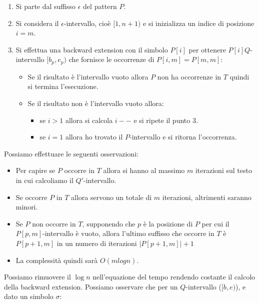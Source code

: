 \begin{enumerate}
    \item Si parte dal suffisso $\epsilon$ del pattern $P$.
    \item Si considera il $\epsilon$-intervallo, cioè $[1,n+1)$ e si inizializza
          un indice di posizione $i=m$.
    \item Si effettua una backward extension con il simbolo $P[i]$ per ottenere
          $P[i]Q$-intervallo $[b_p, e_p)$ che fornisce le occorrenze di $P[i,m] = P[m,m]$:
          \begin{itemize}
              \item Se il risultato è l'intervallo vuoto allora $P$ non ha
                    occorrenze in $T$ quindi si termina l'esecuzione.
              \item Se il risultato non è l'intervallo vuoto allora:
                    \begin{itemize}
                        \item se $i>1$ allora si calcola $i--$ e si ripete il punto $3$.
                        \item se $i=1$ allora ho trovato il $P$-intervallo e
                              si ritorna l'occorrenza.
                    \end{itemize}
          \end{itemize}
\end{enumerate}
Possiamo effettuare le seguenti osservazioni:
\begin{itemize}
    \item Per capire se $P$ occorre in $T$ allora si hanno al massimo $m$
          iterazioni sul testo in cui calcoliamo il $Q'$-intervallo.
    \item Se occorre $P$ in $T$ allora servono un totale di $m$ iterazioni,
          altrimenti saranno minori.
    \item Se $P$ non occorre in $T$, supponendo che $p$ è la posizione di $P$
          per cui il $P[p,m]$-intervallo è vuoto, allora l'ultimo suffisso che
          occorre in $T$ è $P[p+1,m]$ in un numero di iterazioni $|P[p+1,m]|+1$
    \item La complessità quindi sarà $O(mlogn)$.
\end{itemize}
Possiamo rimuovere il $\log n$ nell'equazione del tempo rendendo costante
il calcolo della backward extension. Possiamo osservare che per un $Q$-intervallo
($[b, e)$), e dato un simbolo $\sigma$:
